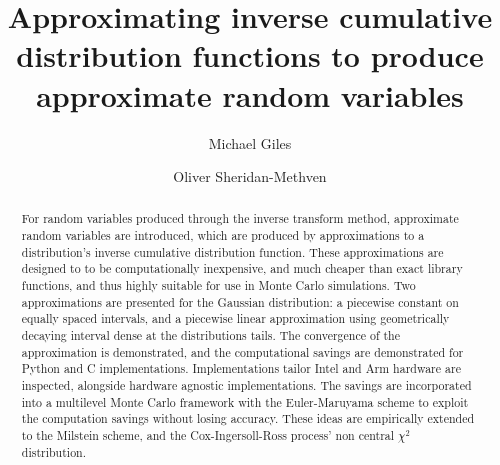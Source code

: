 \documentclass[manuscript,review]{acmart}
\title{Approximating inverse cumulative distribution functions to produce approximate random variables}
\author{Michael Giles}
\author{Oliver Sheridan-Methven}
\affiliation{%
\institution{Mathematical Institute, Oxford University}
\city{Oxford}
\country{UK}}
\begin{document}
\begin{abstract}
For random variables produced through the inverse transform method, approximate random variables are introduced, which are produced by approximations to a distribution's inverse cumulative distribution function. These approximations are designed to to be computationally inexpensive, and much cheaper than exact library functions, and thus highly suitable for use in Monte Carlo simulations. Two approximations are presented for the Gaussian distribution: a piecewise constant on equally spaced intervals, and a piecewise linear approximation using geometrically decaying interval dense at the distributions tails. The convergence of the approximation is demonstrated, and the computational savings are demonstrated for Python and C implementations. Implementations tailor Intel and Arm hardware are inspected, alongside hardware agnostic implementations. The savings are incorporated into a multilevel Monte Carlo framework with the Euler-Maruyama scheme to exploit the computation savings without losing accuracy. These ideas are empirically extended to the Milstein scheme, and the Cox-Ingersoll-Ross process' non central $ \chi^2 $ distribution. 
\end{abstract}
\end{document}

